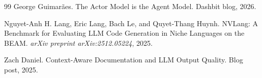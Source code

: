 \documentclass[11pt]{article}
\begin{document}
\begin{thebibliography}{99}
George Guimar\~{a}es.
\newblock The Actor Model is the Agent Model.
\newblock Dashbit blog, 2026.

Nguyet-Anh H. Lang, Eric Lang, Bach Le, and Quyet-Thang Huynh.
\newblock NVLang: A Benchmark for Evaluating LLM Code Generation in Niche Languages on the BEAM.
\newblock \emph{arXiv preprint arXiv:2512.05224}, 2025.

Zach Daniel.
\newblock Context-Aware Documentation and LLM Output Quality.
\newblock Blog post, 2025.

\end{thebibliography}
\end{document}
